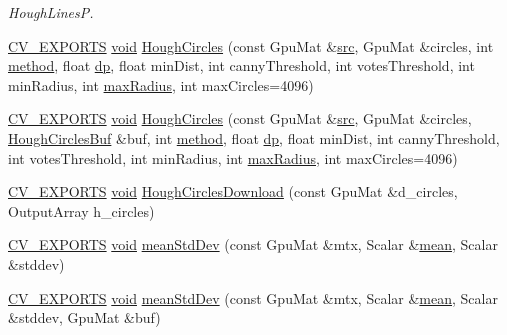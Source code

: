 \begin{DoxyCompactItemize}
\begin{DoxyCompactList}\small\item\em Hough\-Lines\-P. \end{DoxyCompactList}\item 
\hyperlink{core_2types__c_8h_a1bf9f0e121b54272da02379cfccd0a2b}{C\-V\-\_\-\-E\-X\-P\-O\-R\-T\-S} \hyperlink{legacy_8hpp_a8bb47f092d473522721002c86c13b94e}{void} \hyperlink{namespacecv_1_1gpu_a14a9ccff339680c7a1cb84dc88173926}{Hough\-Circles} (const Gpu\-Mat \&\hyperlink{legacy_8hpp_a371cd109b74033bc4366f584edd3dacc}{src}, Gpu\-Mat \&circles, int \hyperlink{legacy_8hpp_adc6d8f8df4f2d0df2ece83c432e2681f}{method}, float \hyperlink{imgproc__c_8h_ab72596cdef510cb9cb1a2b07a9189912}{dp}, float min\-Dist, int canny\-Threshold, int votes\-Threshold, int min\-Radius, int \hyperlink{imgproc__c_8h_aa127cf4ed721c001f0dd39efd29b9790}{max\-Radius}, int max\-Circles=4096)
\item 
\hyperlink{core_2types__c_8h_a1bf9f0e121b54272da02379cfccd0a2b}{C\-V\-\_\-\-E\-X\-P\-O\-R\-T\-S} \hyperlink{legacy_8hpp_a8bb47f092d473522721002c86c13b94e}{void} \hyperlink{namespacecv_1_1gpu_a20adab45c2bfd31a39cb133e1579ec8b}{Hough\-Circles} (const Gpu\-Mat \&\hyperlink{legacy_8hpp_a371cd109b74033bc4366f584edd3dacc}{src}, Gpu\-Mat \&circles, \hyperlink{structcv_1_1gpu_1_1HoughCirclesBuf}{Hough\-Circles\-Buf} \&buf, int \hyperlink{legacy_8hpp_adc6d8f8df4f2d0df2ece83c432e2681f}{method}, float \hyperlink{imgproc__c_8h_ab72596cdef510cb9cb1a2b07a9189912}{dp}, float min\-Dist, int canny\-Threshold, int votes\-Threshold, int min\-Radius, int \hyperlink{imgproc__c_8h_aa127cf4ed721c001f0dd39efd29b9790}{max\-Radius}, int max\-Circles=4096)
\item 
\hyperlink{core_2types__c_8h_a1bf9f0e121b54272da02379cfccd0a2b}{C\-V\-\_\-\-E\-X\-P\-O\-R\-T\-S} \hyperlink{legacy_8hpp_a8bb47f092d473522721002c86c13b94e}{void} \hyperlink{namespacecv_1_1gpu_ac8341096e9077b6274ab026a545d63ec}{Hough\-Circles\-Download} (const Gpu\-Mat \&d\-\_\-circles, Output\-Array h\-\_\-circles)
\item 
\hyperlink{core_2types__c_8h_a1bf9f0e121b54272da02379cfccd0a2b}{C\-V\-\_\-\-E\-X\-P\-O\-R\-T\-S} \hyperlink{legacy_8hpp_a8bb47f092d473522721002c86c13b94e}{void} \hyperlink{namespacecv_1_1gpu_adc0eb419e9d30a0dae4cd37f027732b7}{mean\-Std\-Dev} (const Gpu\-Mat \&mtx, Scalar \&\hyperlink{core__c_8h_ad090d0faa53f44e0377c8d63dab3fa20}{mean}, Scalar \&stddev)
\item 
\hyperlink{core_2types__c_8h_a1bf9f0e121b54272da02379cfccd0a2b}{C\-V\-\_\-\-E\-X\-P\-O\-R\-T\-S} \hyperlink{legacy_8hpp_a8bb47f092d473522721002c86c13b94e}{void} \hyperlink{namespacecv_1_1gpu_a3cf3b2d9e9535796b6b415501b5989d9}{mean\-Std\-Dev} (const Gpu\-Mat \&mtx, Scalar \&\hyperlink{core__c_8h_ad090d0faa53f44e0377c8d63dab3fa20}{mean}, Scalar \&stddev, Gpu\-Mat \&buf)

\end{DoxyCompactItemize}
